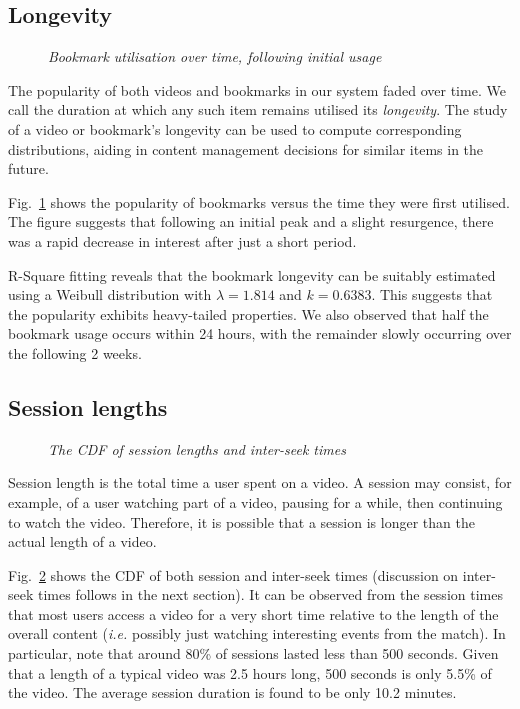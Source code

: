 \documentclass[letterpaper,nocopyrightspace]{sig-alternate}
\newcommand{\capttext}{\protect\centering\em}
\begin{document}
\subsection{Longevity}
\label{sect:stay_popular}
\begin{figure}[tb]
\centering {} \caption{\capttext Bookmark utilisation over
time, following initial usage} \label{fig:lifetimes}
\end{figure}

The popularity of both videos and bookmarks in our system faded over
time. We call the duration at which any such item remains utilised
its \emph{longevity}. The study of a video or bookmark's longevity
can be used to compute corresponding distributions, aiding in
content management decisions for similar items in the future.

Fig.~\ref{fig:lifetimes} shows the popularity of bookmarks versus
the time they were first utilised. The figure suggests that
following an initial peak and a slight resurgence, there was a rapid
decrease in interest after just a short period.

R-Square fitting reveals that the bookmark longevity can be suitably
estimated using a Weibull distribution with $\lambda=1.814$ and
$k=0.6383$. This suggests that the popularity exhibits heavy-tailed
properties. We also observed that half the bookmark usage occurs
within 24 hours, with the remainder slowly occurring over the
following 2 weeks.

\subsection{Session lengths}
\begin{figure}[tb]
\centering {} \caption{\capttext The CDF of session lengths
and inter-seek times} \label{fig:view_user_session}
\end{figure}

Session length is the total time a user spent on a video. A session
may consist, for example, of a user watching part of a video,
pausing for a while, then continuing to watch the video. Therefore,
it is possible that a session is longer than the actual length of a
video.

Fig.~\ref{fig:view_user_session} shows the CDF of both session and
inter-seek times (discussion on inter-seek times follows in the next
section). It can be observed from the session times that most users
access a video for a very short time relative to the length of the
overall content (\emph{i.e.} possibly just watching interesting
events from the match). In particular, note that around 80\% of
sessions lasted less than 500 seconds. Given that a length of a
typical video was 2.5 hours long, 500 seconds is only 5.5\% of the
video. The average session duration is found to be only 10.2
minutes.
\end{document}
